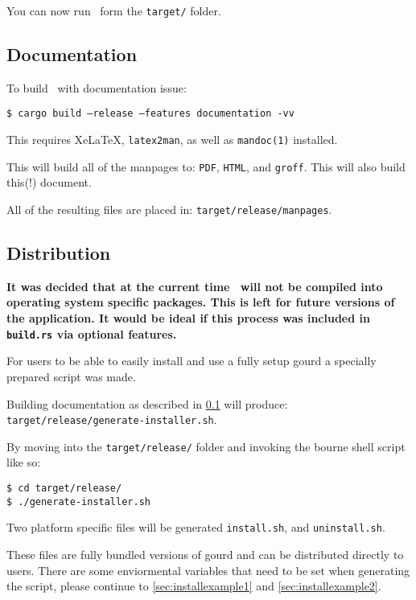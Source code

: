 You can now run \gourd\ form the \texttt{target/} folder.

\subsection{Documentation}
\label{sec:docbuild}

To build \gourd\ with documentation issue:

\texttt{\$ cargo build --release --features documentation -vv}
\vspace{0.5cm}

\noindent This requires Xe\LaTeX, \texttt{latex2man}, as well as \texttt{mandoc(1)} installed.

This will build all of the manpages to: \texttt{PDF}, \texttt{HTML}, and \texttt{groff}.
This will also build this(!) document.

All of the resulting files are placed in: \texttt{target/release/manpages}.


\subsection{Distribution}
\textcolor{red!30!black}{\textbf{
  It was decided that at the current time \gourd\ will not be compiled into
  operating system specific packages. This is left for future versions of the application.
  It would be ideal if this process was included in \texttt{build.rs} via optional features.
}}
\vspace{0.3cm}

For users to be able to easily install and use a fully setup gourd a specially prepared script was made.

Building documentation as described in \ref{sec:docbuild} will produce: \\
\texttt{target/release/generate-installer.sh}.

By moving into the \texttt{target/release/} folder and invoking the bourne shell script like so:

\begin{verbatim}
$ cd target/release/
$ ./generate-installer.sh
\end{verbatim}

Two platform specific files will be generated \texttt{install.sh}, and \texttt{uninstall.sh}.

These files are fully bundled versions of gourd and can be distributed directly to users.
There are some enviormental variables that need to be set when generating the script,
please continue to \ref{sec:installexample1} and \ref{sec:installexample2}.

